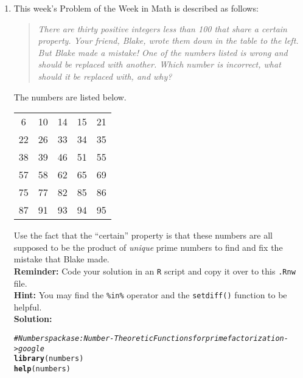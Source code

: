 \documentclass{article}\usepackage[]{graphicx}\usepackage[]{xcolor}
\makeatletter
\newcommand{\hlcom}[1]{\textcolor[rgb]{0.678,0.584,0.686}{\textit{#1}}}%
\newcommand{\hldef}[1]{\textcolor[rgb]{0.345,0.345,0.345}{#1}}%
\newcommand{\hlkwd}[1]{\textcolor[rgb]{0.737,0.353,0.396}{\textbf{#1}}}%
\newenvironment{kframe}{%
 \def\at@end@of@kframe{}%
 \ifinner\ifhmode%
  \def\at@end@of@kframe{\end{minipage}}%
  \begin{minipage}{\columnwidth}%
 \fi\fi%
 \def\FrameCommand##1{\hskip\@totalleftmargin \hskip-\fboxsep
 \colorbox{shadecolor}{##1}\hskip-\fboxsep
     \hskip-\linewidth \hskip-\@totalleftmargin \hskip\columnwidth}%
 \MakeFramed {\advance\hsize-\width
   \@totalleftmargin\z@ \linewidth\hsize
   \@setminipage}}%
 {\par\unskip\endMakeFramed%
 \at@end@of@kframe}
\newenvironment{knitrout}{}{} %
\makeatother
\begin{document}
\begin{enumerate}
\item This week's Problem of the Week in Math is described as follows:
\begin{quotation}
  \textit{There are thirty positive integers less than 100 that share a certain 
  property. Your friend, Blake, wrote them down in the table to the left. But 
  Blake made a mistake! One of the numbers listed is wrong and should be replaced 
  with another. Which number is incorrect, what should it be replaced with, and 
  why?}
\end{quotation}
The numbers are listed below.
\begin{center}
  \begin{tabular}{ccccc}
    6 & 10 & 14 & 15 & 21\\
    22 & 26 & 33 & 34 & 35\\
    38 & 39 & 46 & 51 & 55\\
    57 & 58 & 62 & 65 & 69\\
    75 & 77 & 82 & 85 & 86\\
    87 & 91 & 93 & 94 & 95
  \end{tabular}
\end{center}
Use the fact that the ``certain'' property is that these numbers are all supposed
to be the product of \emph{unique} prime numbers to find and fix the mistake that
Blake made.\\
\textbf{Reminder:} Code your solution in an \texttt{R} script and copy it over
to this \texttt{.Rnw} file.\\
\textbf{Hint:} You may find the \verb|%in%| operator and the \verb|setdiff()| function to be helpful.\\

\textbf{Solution:} 

\begin{knitrout}\scriptsize
{}\color{fgcolor}\begin{kframe}
\begin{alltt}
\hlcom{# Numbers packase: Number-Theoretic Functions for prime factorization -> google}
\hlkwd{library}\hldef{(numbers)}
\hlkwd{help}\hldef{(numbers)}


\end{alltt}
\end{kframe}
\end{knitrout}
\end{enumerate}
\end{document}
